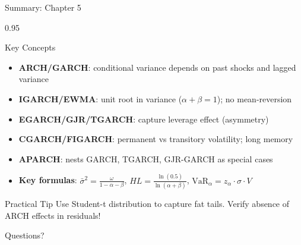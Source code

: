 \documentclass[9pt, aspectratio=169, t]{beamer}
\begin{document}
\begin{frame}{Summary: Chapter 5}
    \begin{cminipage}{0.95\textwidth}
    \begin{exampleblock}{Key Concepts}
        \begin{itemize}\setlength{\itemsep}{2pt}
            \item[\textcolor{MainBlue}{\textbf{1.}}] \textbf{ARCH/GARCH}: conditional variance depends on past shocks and lagged variance
            \item[\textcolor{MainBlue}{\textbf{2.}}] \textbf{IGARCH/EWMA}: unit root in variance ($\alpha + \beta = 1$); no mean-reversion
            \item[\textcolor{MainBlue}{\textbf{3.}}] \textbf{EGARCH/GJR/TGARCH}: capture leverage effect (asymmetry)
            \item[\textcolor{MainBlue}{\textbf{4.}}] \textbf{CGARCH/FIGARCH}: permanent vs transitory volatility; long memory
            \item[\textcolor{MainBlue}{\textbf{5.}}] \textbf{APARCH}: nests GARCH, TGARCH, GJR-GARCH as special cases
            \item[\textcolor{MainBlue}{\textbf{6.}}] \textbf{Key formulas}: $\bar{\sigma}^2 = \frac{\omega}{1 - \alpha - \beta}$, $HL = \frac{\ln(0.5)}{\ln(\alpha + \beta)}$, $\text{VaR}_\alpha = z_\alpha \cdot \sigma \cdot V$
        \end{itemize}
    \end{exampleblock}

    \vspace{0.3cm}

    \begin{alertblock}{Practical Tip}
        Use Student-t distribution to capture fat tails. Verify absence of ARCH effects in residuals!
    \end{alertblock}

    \vspace{0.3cm}
    \begin{center}
        \Large\textcolor{MainBlue}{Questions?}
    \end{center}
    \end{cminipage}
\end{frame}
\end{document}
